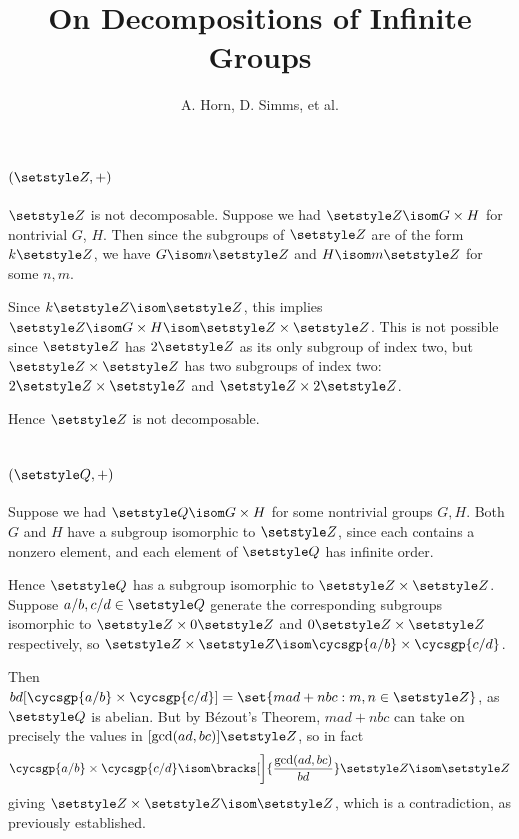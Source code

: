 \documentclass[fleqn,a4paper,11pt]{article}
\title{On Decompositions of Infinite Groups}
\author{A. Horn, D. Simms, et al.}
\begin{document}
\maketitle

\section{\((\Integers, +)\)}
\(\Integers\) is not decomposable. Suppose we had
\(\Integers \isom G \times H\) for nontrivial \(G\), \(H\). Then since the
subgroups of \(\Integers\) are of the form \(k\Integers\), we have
\(G \isom n\Integers\) and \(H \isom m\Integers\) for some \(n, m\).

Since \(k\Integers \isom \Integers\), this implies
\(\Integers \isom G \times H \isom \Integers \times \Integers\). This is not
possible since \(\Integers\) has \(2\Integers\) as its only subgroup of index
two, but \(\Integers \times \Integers\) has two subgroups of index two:
\(2\Integers \times \Integers\) and \(\Integers \times 2\Integers\).

Hence \(\Integers\) is not decomposable.

\section{\((\Rationals, +)\)}

Suppose we had \(\Rationals \isom G \times H\) for some nontrivial groups
\(G, H\). Both \(G\) and \(H\) have a subgroup isomorphic to \(\Integers\),
since each contains a nonzero element, and each element of \(\Rationals\) has
infinite order.

Hence \(\Rationals\) has a subgroup isomorphic to
\(\Integers \times \Integers\). Suppose \(a/b, c/d \in \Rationals\) generate the
corresponding subgroups isomorphic to
\(\Integers \times 0\Integers\) and \(0\Integers \times \Integers\)
respectively, so
\(\Integers \times \Integers \isom \cycsgp{a/b} \times \cycsgp{c/d}\).

Then
\(bd[\cycsgp{a/b} \times \cycsgp{c/d}]
  = \set{mad + nbc : m, n \in \Integers}\), as
\(\Rationals\) is abelian. But by B\'ezout's Theorem, \(mad + nbc\) can take on
precisely the values in \([\gcd(ad, bc)]\Integers\), so in fact
\begin{equation*}
 \cycsgp{a/b} \times \cycsgp{c/d}
 \isom \bracks[\bigg]{\frac{\gcd(ad, bc)}{bd}}\Integers
 \isom \Integers
\end{equation*}
giving \(\Integers \times \Integers \isom \Integers\), which is a contradiction,
as previously established.
\end{document}
